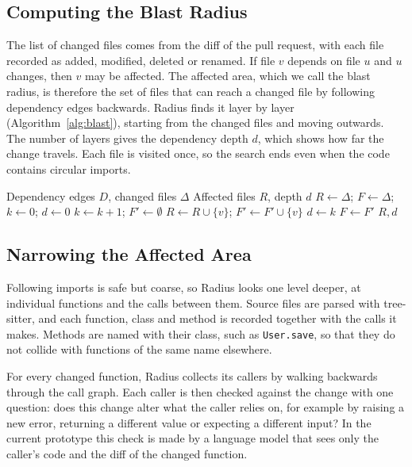 \documentclass[conference]{IEEEtran}
\begin{document}
\subsection{Computing the Blast Radius}
The list of changed files comes from the diff of the pull request, with each file recorded as added, modified, deleted or renamed. If file $v$ depends on file $u$ and $u$ changes, then $v$ may be affected. The affected area, which we call the blast radius, is therefore the set of files that can reach a changed file by following dependency edges backwards. Radius finds it layer by layer (Algorithm~\ref{alg:blast}), starting from the changed files and moving outwards. The number of layers gives the dependency depth $d$, which shows how far the change travels. Each file is visited once, so the search ends even when the code contains circular imports.

\begin{algorithm}[t]
\caption{Blast radius by reverse reachability}
\label{alg:blast}
\begin{algorithmic}[1]
\Require Dependency edges $D$, changed files $\Delta$
\Ensure Affected files $R$, depth $d$
\State $R \gets \Delta$; \quad $F \gets \Delta$; \quad $k \gets 0$; \quad $d \gets 0$
    \State $k \gets k+1$; \quad $F' \gets \emptyset$
        \State $R \gets R \cup \{v\}$; \quad $F' \gets F' \cup \{v\}$
    \EndFor
     \State $d \gets k$ \EndIf
    \State $F \gets F'$
\EndWhile
\State \Return $R, d$
\end{algorithmic}
\end{algorithm}

\subsection{Narrowing the Affected Area}
Following imports is safe but coarse, so Radius looks one level deeper, at individual functions and the calls between them. Source files are parsed with tree-sitter, and each function, class and method is recorded together with the calls it makes. Methods are named with their class, such as \texttt{User.save}, so that they do not collide with functions of the same name elsewhere.

For every changed function, Radius collects its callers by walking backwards through the call graph. Each caller is then checked against the change with one question: does this change alter what the caller relies on, for example by raising a new error, returning a different value or expecting a different input? In the current prototype this check is made by a language model that sees only the caller's code and the diff of the changed function.
\end{document}
